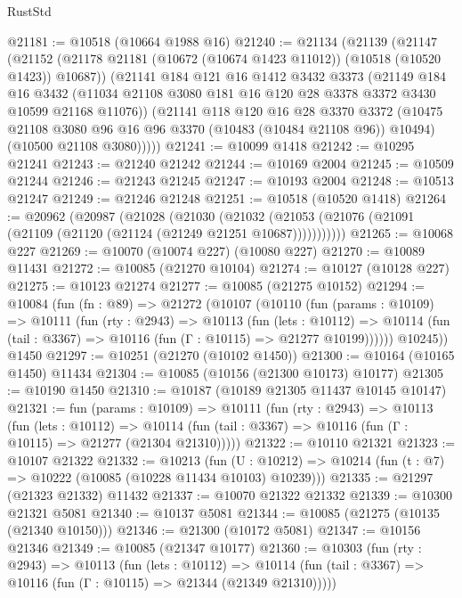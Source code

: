 \begin{lexlean}{RustStd}
\begin{coremodule}
@21181 := @10518 (@10664 @1988 @16)
@21240 := @21134
    (@21139
      (@21147
        (@21152 (@21178 @21181 (@10672 (@10674 @1423 @11012)) (@10518 (@10520 @1423)) @10687))
        (@21141
          @184
          @121
          @16
          @1412
          @3432
          @3373
          (@21149
            @184
            @16
            @3432
            (@11034 @21108 @3080 @181 @16 @120 @28 @3378 @3372 @3430 @10599 @21168 @11076))
          (@21141
            @118
            @120
            @16
            @28
            @3370
            @3372
            (@10475 @21108 @3080 @96 @16 @96 @3370 (@10483 (@10484 @21108 @96)) @10494)
            (@10500 @21108 @3080)))))
@21241 := @10099 @1418
@21242 := @10295 @21241
@21243 := @21240 @21242
@21244 := @10169 @2004
@21245 := @10509 @21244
@21246 := @21243 @21245
@21247 := @10193 @2004
@21248 := @10513 @21247
@21249 := @21246 @21248
@21251 := @10518 (@10520 @1418)
@21264 := @20962
    (@20987
      (@21028
        (@21030
          (@21032 (@21053 (@21076 (@21091 (@21109 (@21120 (@21124 (@21249 @21251 @10687)))))))))))
@21265 := @10068 @227
@21269 := @10070 (@10074 @227) (@10080 @227)
@21270 := @10089 @11431
@21272 := @10085 (@21270 @10104)
@21274 := @10127 (@10128 @227)
@21275 := @10123 @21274
@21277 := @10085 (@21275 @10152)
@21294 := @10084
    (fun (fn : @89) =>
    @21272
      (@10107
        (@10110
          (fun (params : @10109) =>
          @10111
            (fun (rty : @2943) =>
            @10113
              (fun (lets : @10112) =>
              @10114 (fun (tail : @3367) => @10116 (fun (Γ : @10115) => @21277 @10199))))))
        @10245))
    @1450
@21297 := @10251 (@21270 (@10102 @1450))
@21300 := @10164 (@10165 @1450) @11434
@21304 := @10085 (@10156 (@21300 @10173) @10177)
@21305 := @10190 @1450
@21310 := @10187 (@10189 @21305 @11437 @10145 @10147)
@21321 := fun (params : @10109) =>
  @10111
    (fun (rty : @2943) =>
    @10113
      (fun (lets : @10112) =>
      @10114 (fun (tail : @3367) => @10116 (fun (Γ : @10115) => @21277 (@21304 @21310)))))
@21322 := @10110 @21321
@21323 := @10107 @21322
@21332 := @10213
    (fun (U : @10212) => @10214 (fun (t : @7) => @10222 (@10085 (@10228 @11434 @10103) @10239)))
@21335 := @21297 (@21323 @21332) @11432
@21337 := @10070 @21322 @21332
@21339 := @10300 @21321 @5081
@21340 := @10137 @5081
@21344 := @10085 (@21275 (@10135 (@21340 @10150)))
@21346 := @21300 (@10172 @5081)
@21347 := @10156 @21346
@21349 := @10085 (@21347 @10177)
@21360 := @10303
    (fun (rty : @2943) =>
    @10113
      (fun (lets : @10112) =>
      @10114 (fun (tail : @3367) => @10116 (fun (Γ : @10115) => @21344 (@21349 @21310)))))

\end{coremodule}
\end{lexlean}
